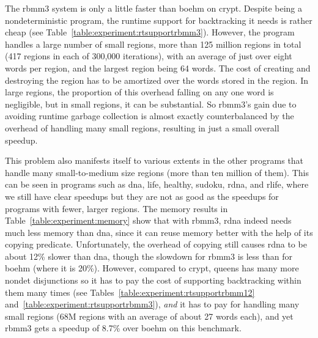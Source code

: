 \documentclass{tlp}
\newcommand{\bench}[1]{{#1}}
\begin{document}
The rbmm3 system is only a little faster than boehm on \bench{crypt}.
Despite being a nondeterministic program,
the runtime support for backtracking it needs is rather cheap
(see Table~\ref{table:experiment:rtsupportrbmm3}).
However, the program handles a large number of small regions,
more than 125 million regions in total
(417 regions in each of 300,000 iterations),
with an average of just over eight words per region,
and the largest region being 64 words.
The cost of creating and destroying the region
has to be amortized over the words stored in the region.
In large regions,
the proportion of this overhead falling on any one word is negligible, but
in small regions, it can be substantial.
So rbmm3's gain due to avoiding runtime garbage collection
is almost exactly counterbalanced
by the overhead of handling many small regions,
resulting in just a small overall speedup.

This problem also manifests itself to various extents
in the other programs that handle many small-to-medium size regions
(more than ten million of them).
This can be seen in programs such as
\bench{dna}, \bench{life}, \bench{healthy}, \bench{sudoku},
\bench{rdna}, and \bench{rlife},
where we still have clear speedups
but they are not as good
as the speedups for programs with fewer, larger regions.
The memory results in Table~\ref{table:experiment:memory}
show that with rbmm3,
\bench{rdna} indeed needs much less memory than \bench{dna},
since it can reuse memory better with the help of its copying predicate.
Unfortunately, the overhead of copying
still causes \bench{rdna} to be about 12\% slower than \bench{dna},
though the slowdown for rbmm3 is less than for boehm (where it is 20\%).
However, compared to \bench{crypt},
\bench{queens} has many more nondet disjunctions
so it has to pay the cost of supporting backtracking within them many times
(see Tables~\ref{table:experiment:rtsupportrbmm12}
and~\ref{table:experiment:rtsupportrbmm3}),
\emph{and} it has to pay for handling many small regions
(68M regions with an average of about 27 words each),
and yet rbmm3 gets a speedup of 8.7\% over boehm on this benchmark.
\end{document}
